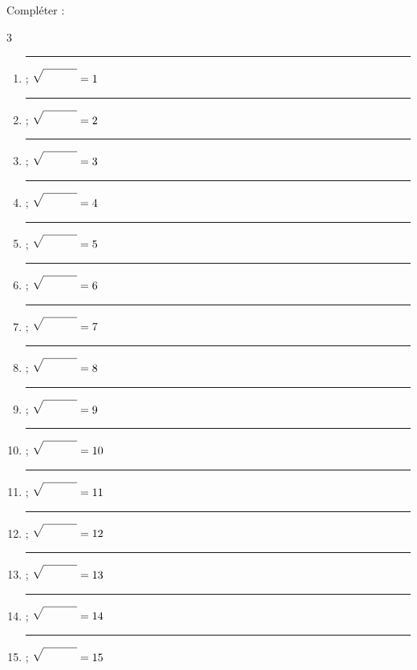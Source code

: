 \begin{example} Compléter :
	\begin{multicols}{3}
		\begin{enumerate}[label={$\arabic*^2=$}]
			\item \rule{3em}{0pt}\rule{0pt}{1em} ; $\sqrt{\rule{3em}{0pt}\rule{0pt}{1.1em}}=1$
			\item \rule{3em}{0pt}\rule{0pt}{1em} ; $\sqrt{\rule{3em}{0pt}\rule{0pt}{1.1em}}=2$
			\item \rule{3em}{0pt}\rule{0pt}{1em} ; $\sqrt{\rule{3em}{0pt}\rule{0pt}{1.1em}}=3$
			\item \rule{3em}{0pt}\rule{0pt}{1em} ; $\sqrt{\rule{3em}{0pt}\rule{0pt}{1.1em}}=4$
			\item \rule{3em}{0pt}\rule{0pt}{1em} ; $\sqrt{\rule{3em}{0pt}\rule{0pt}{1.1em}}=5$
			\item\rule{3em}{0pt}\rule{0pt}{1em} ; $\sqrt{\rule{3em}{0pt}\rule{0pt}{1.1em}}=6$ 
			\item \rule{3em}{0pt}\rule{0pt}{1em} ; $\sqrt{\rule{3em}{0pt}\rule{0pt}{1.1em}}=7$
			\item \rule{3em}{0pt}\rule{0pt}{1em} ; $\sqrt{\rule{3em}{0pt}\rule{0pt}{1.1em}}=8$
			\item \rule{3em}{0pt}\rule{0pt}{1em} ; $\sqrt{\rule{3em}{0pt}\rule{0pt}{1.1em}}=9$
			\item \rule{3em}{0pt}\rule{0pt}{1em} ; $\sqrt{\rule{3em}{0pt}\rule{0pt}{1.1em}}=10$
			\item \rule{3em}{0pt}\rule{0pt}{1em} ; $\sqrt{\rule{3em}{0pt}\rule{0pt}{1.1em}}=11$
			\item \rule{3em}{0pt}\rule{0pt}{1em} ; $\sqrt{\rule{3em}{0pt}\rule{0pt}{1.1em}}=12$
			\item \rule{3em}{0pt}\rule{0pt}{1em} ; $\sqrt{\rule{3em}{0pt}\rule{0pt}{1.1em}}=13$
			\item \rule{3em}{0pt}\rule{0pt}{1em} ; $\sqrt{\rule{3em}{0pt}\rule{0pt}{1.1em}}=14$
			\item \rule{3em}{0pt}\rule{0pt}{1em} ; $\sqrt{\rule{3em}{0pt}\rule{0pt}{1.1em}}=15$
		\end{enumerate} 
	\end{multicols}
\end{example}
